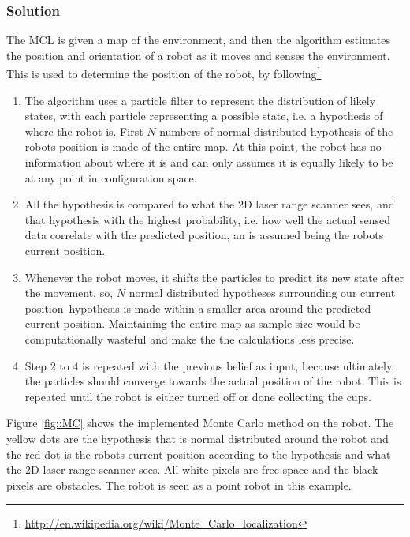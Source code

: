 \subsubsection{Solution}
The MCL is given a map of the environment, and then the algorithm estimates the position and orientation of a robot as it moves and senses the environment. This is used to determine the position of the robot, by following\footnote{\url{http://en.wikipedia.org/wiki/Monte_Carlo_localization}} 
\begin{enumerate}\itemsep-2pt
\item The algorithm uses a particle filter to represent the distribution of likely states, with each particle representing a possible state, i.e. a hypothesis of where the robot is. First $N$ numbers of normal distributed hypothesis of the robots position is made of the entire map. At this point, the robot has no information about where it is and can only assumes it is equally likely to be at any point in configuration space.
\item All the hypothesis is compared to what the 2D laser range scanner sees, and that hypothesis with the highest probability, i.e. how well the actual sensed data correlate with the predicted position, an is assumed being the robots current position.
\item Whenever the robot moves, it shifts the particles to predict its new state after the movement, so, $N$ normal distributed hypotheses surrounding our current position--hypothesis is made within a smaller area around the predicted current position. Maintaining the entire map as sample size would be computationally wasteful and make the the calculations less precise.
\item Step 2 to 4 is repeated with the previous belief as input, because ultimately, the particles should converge towards the actual position of the robot. This is repeated until the robot is either turned off or done collecting the cups.
\end{enumerate}
Figure \ref{fig::MC} shows the implemented Monte Carlo method on the robot. The yellow dots are the hypothesis that is normal distributed around the robot and the red dot is the robots current position according to the hypothesis and what the 2D laser range scanner sees. All white pixels are free space and the black pixels are obstacles. The robot is seen as a point robot in this example.\\[0.2cm]

